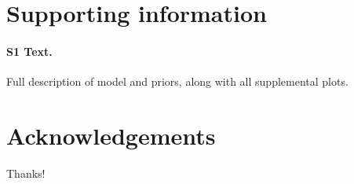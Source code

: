 \documentclass[10pt,letterpaper]{article}
\begin{document}
\section*{Supporting information}

\paragraph*{S1 Text.}
\label{S1}
{Full description of model and priors, along with all supplemental plots.}

\section*{Acknowledgements}

Thanks!

\nolinenumbers

%
%
% 



\end{document}
